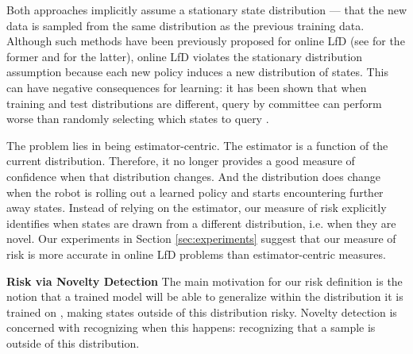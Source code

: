 \documentclass[10pt, conference]{ieeeconf}      %
\begin{document}
Both approaches implicitly assume a stationary state distribution --- that the new data is sampled from the same distribution as the previous training data. Although such methods have been previously proposed for online LfD (see \cite{chernova2009interactive,grollman2007dogged} for the former and \cite{judah2011active,judah2012active} for the latter),
online LfD violates the stationary distribution assumption because each new policy induces a new distribution of states. This can have negative consequences for learning: it has been shown that when training and test distributions are different, query by committee can perform worse than randomly selecting  which states to query \cite{burbidge2007active}.

The problem lies in being estimator-centric. The  estimator is a function of the current distribution. Therefore, it no longer provides a good measure of confidence when that distribution changes. And the distribution does change when the robot is rolling out a learned policy and starts encountering further away states. Instead of relying on the estimator, our measure of risk explicitly identifies when states are drawn from a different distribution, i.e. when they are novel. Our experiments in Section \ref{sec:experiments} suggest that our measure of risk is more accurate in online LfD problems than estimator-centric measures.



\noindent\textbf{Risk via Novelty Detection}
The main motivation for our risk definition is the notion that a trained model will be able to generalize within the distribution it is
trained on \cite{tokdar2010importance}, making states outside of this distribution risky. Novelty detection \cite{hodge2004survey} is concerned with recognizing when this happens: recognizing that a sample is outside of this distribution.
\end{document}

